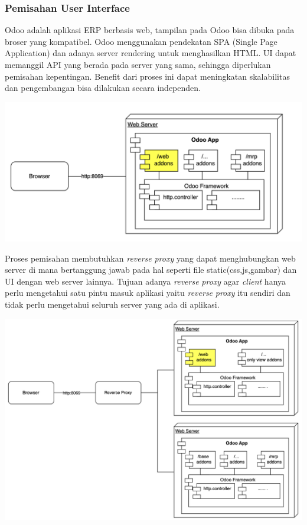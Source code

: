 \subsubsection{Pemisahan User Interface}
Odoo adalah aplikasi ERP berbasis web, tampilan pada Odoo bisa dibuka pada broser yang kompatibel. Odoo menggunakan pendekatan SPA (Single Page Application) dan adanya server rendering untuk menghasilkan HTML. UI dapat memanggil API yang berada pada server yang sama, sehingga diperlukan pemisahan kepentingan. Benefit dari proses ini dapat meningkatan skalabilitas dan pengembangan bisa dilakukan secara independen.
\begin{center}
	\includegraphics[width=14cm]{img/bab_3/monoUI.png}
	\label{fig:asd}
\end{center}
Proses pemisahan membutuhkan \textit{reverse} \textit{proxy} yang dapat menghubungkan web server di mana bertanggung jawab pada hal seperti file static(css,js,gambar) dan UI dengan web server lainnya. Tujuan adanya \textit{reverse} \textit{proxy} agar \textit{client} hanya perlu mengetahui satu pintu masuk aplikasi yaitu \textit{reverse} \textit{proxy} itu sendiri dan tidak perlu mengetahui seluruh server yang ada di aplikasi.
\begin{center}
	\includegraphics[width=14cm]{img/bab_3/microUI.png}
	\label{fig:asd}
\end{center}

